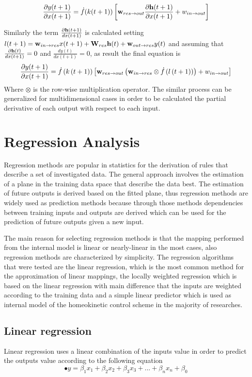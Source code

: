 \documentclass[msc,ai,logo]{infthesis}
\begin{document}
\[\frac{{\partial y(t + 1)}}{{\partial x(t + 1)}} = \dot f(k(t + 1))\left[ {{{\bf{w}}_{res \to out}}\frac{{\partial {\bf{h}}(t + 1)}}{{\partial x(t + 1)}} + {w_{in \to out}}} \right]\]

Similarly the term ${\frac{{\partial {\bf{h}}(t + 1)}}{{dx(t + 1)}}}$ is calculated setting $l(t+1)={{\bf{w}}_{in \to res}}x(t + 1) + {{\bf{W}}_{res}}{\bf{h}}(t) + {{\bf{w}}_{out \to res}}y(t)$ and assuming that ${\frac{{\partial {\bf{h}}(t)}}{{dx(t + 1)}}}=0$ and 
${\frac{{dy(t )}}{{dx(t + 1)}}} =0 $, as result the final equation is
\begin{equation}
\frac{{\partial y(t + 1)}}{{\partial x(t + 1)}} = \dot f\left( {k\left( {t + 1} \right)} \right)\left[ {{{\bf{w}}_{res \to out}}\left( {{{\bf{w}}_{in \to res}} \otimes \dot f\left( {l\left( {t + 1} \right)} \right)} \right) + {w_{in \to out}}} \right]
 \end{equation}
Where $\otimes$ is the row-wise multiplication operator. The similar process can be generalized for multidimensional cases in order to be calculated the partial derivative of each output with respect to each input.

\section{Regression Analysis}
Regression methods are popular in statistics for the derivation of rules that describe a set of investigated data. The general approach involves the estimation of a plane in the training data space that describe the data best. The estimation of future outputs is derived based on the fitted plane, thus regression methods are widely used as prediction methods because through those methods dependencies between training inputs and outputs are derived which can be used for the prediction of future outputs given a new input.

The main reason for selecting regression methods is that the mapping performed from the internal model is linear or nearly-linear in the most cases, also regression methods are characterized by simplicity. The regression algorithms that were tested are the linear regression, which is the most common method for the approximation of linear mappings, the locally weighted regression which is based on the linear regression with main difference that the inputs are weighted according to the training data and a simple linear predictor which is used as internal model of the homeokinetic control scheme in the majority of researches.
\subsection{Linear regression}   
Linear regression uses a linear combination of the inputs value in order to predict the outputs value according to the following equation 
\begin{equation}
•y = {\beta _1}{x_1} + {\beta _2}{x_2} + {\beta _3}{x_3} + ... + {\beta _n}{x_n}+\beta _0
\label{eq:lr1}
\end{equation}
\end{document}
